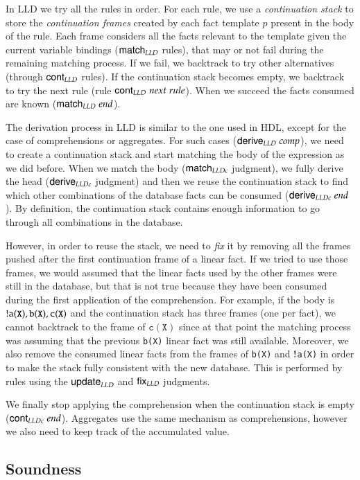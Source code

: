 In LLD we try all the rules in order. For each rule, we use a \emph{continuation stack} to store the \emph{continuation frames} created by
each fact template $p$ present
in the body of the rule. Each frame considers all the facts relevant to the template given the current variable bindings ($\mathsf{match}_{LLD} \;$rules), that
may or not fail during the remaining matching process. If we fail, we backtrack to try other alternatives (through $\mathsf{cont}_{LLD} \;$rules). If the
continuation stack becomes empty, we backtrack to try the next rule (rule $\mathsf{cont}_{LLD} \; next \; rule$). When we succeed the facts consumed are known
($\mathsf{match}_{LLD} \; end$).

The derivation process in LLD is similar to the one used in HDL, except for the case of comprehensions or aggregates. For such cases
($\mathsf{derive}_{LLD} \; comp$), we need to create a continuation stack and start matching the body of the expression as we did before.
When we match the body ($\mathsf{match}_{LLDc} \;$judgment), we fully derive the head ($\mathsf{derive}_{LLDc} \;$judgment) and then we reuse the continuation stack to find which
other combinations of the database facts can be consumed ($\mathsf{derive}_{LLDc} \; end$). By definition, the continuation stack contains
enough information to go through all combinations in the database.

However, in order to reuse the stack, we need to \emph{fix} it by removing all the frames pushed after the first continuation frame
of a linear fact. If we tried to use those frames, we would assumed that the linear facts used by the other frames were still in the database, but that
is not true because they have been consumed during the first application of the comprehension.
For example, if the body is ${!}\mathtt{a(X), b(X), c(X)}$ and the continuation stack has three frames (one per fact), we cannot backtrack to the frame of $\mathtt{c(X)}$
since at that point the matching process was assuming that the previous \texttt{b(X)} linear fact was still available.
Moreover, we also remove the consumed linear facts
from the frames of \texttt{b(X)} and ${!}$\texttt{a(X)} in order to make the stack fully consistent with the new database.
This is performed by rules using the $\mathsf{update}_{LLD} \;$and $\mathsf{fix}_{LLD} \;$judgments.

We finally stop applying the comprehension when the continuation stack is empty ($\mathsf{cont}_{LLDc} \; end$). 
Aggregates use the same mechanism as comprehensions, however we also need to keep track of the accumulated value.

\subsection{Soundness}

